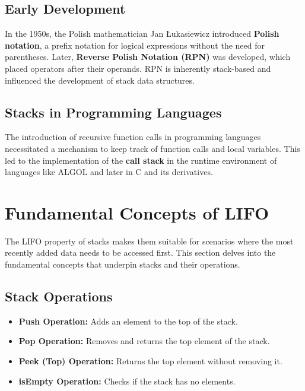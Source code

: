 \subsection{Early Development}

In the 1950s, the Polish mathematician Jan Łukasiewicz introduced \textbf{Polish notation}, a prefix notation for logical expressions without the need for parentheses. Later, \textbf{Reverse Polish Notation (RPN)} was developed, which placed operators after their operands. RPN is inherently stack-based and influenced the development of stack data structures.

\subsection{Stacks in Programming Languages}

The introduction of recursive function calls in programming languages necessitated a mechanism to keep track of function calls and local variables. This led to the implementation of the \textbf{call stack} in the runtime environment of languages like ALGOL and later in C and its derivatives.

\section{Fundamental Concepts of LIFO}

The LIFO property of stacks makes them suitable for scenarios where the most recently added data needs to be accessed first. This section delves into the fundamental concepts that underpin stacks and their operations.

\subsection{Stack Operations}

\begin{itemize}
    \item \textbf{Push Operation:} Adds an element to the top of the stack.
    \item \textbf{Pop Operation:} Removes and returns the top element of the stack.
    \item \textbf{Peek (Top) Operation:} Returns the top element without removing it.
    \item \textbf{isEmpty Operation:} Checks if the stack has no elements.
\end{itemize}

